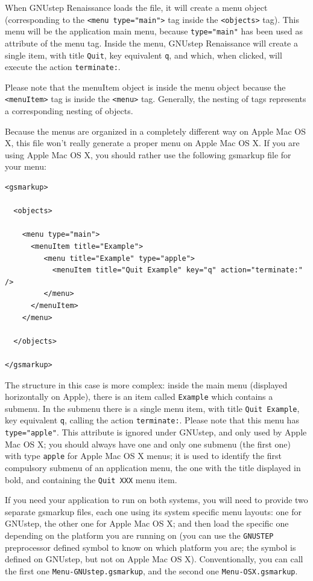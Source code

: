 \documentclass[a4paper]{article}
\begin{document}
When GNUstep Renaissance loads the file, it will create a menu object
(corresponding to the \texttt{<menu type="main">} tag inside the
\texttt{<objects>} tag).  This menu will be the application main menu,
because \texttt{type="main"} has been used as attribute of the menu
tag.  Inside the menu, GNUstep Renaissance will create a single item,
with title \texttt{Quit}, key equivalent \texttt{q}, and which, when
clicked, will execute the action \texttt{terminate:}.

Please note that the menuItem object is inside the menu object because
the \texttt{<menuItem>} tag is inside the \texttt{<menu>} tag.
Generally, the nesting of tags represents a corresponding nesting of
objects.

Because the menus are organized in a completely different way on Apple
Mac OS X, this file won't really generate a proper menu on Apple Mac
OS X.  If you are using Apple Mac OS X, you should rather use the
following gsmarkup file for your menu:
\begin{verbatim}
<gsmarkup>

  <objects>

    <menu type="main">
      <menuItem title="Example">
         <menu title="Example" type="apple">
           <menuItem title="Quit Example" key="q" action="terminate:" />
         </menu>
      </menuItem>
    </menu>
 
  </objects>

</gsmarkup>
\end{verbatim}
The structure in this case is more complex: inside the main menu
(displayed horizontally on Apple), there is an item called
\texttt{Example} which contains a submenu.  In the submenu there is a
single menu item, with title \texttt{Quit Example}, key equivalent
\texttt{q}, calling the action \texttt{terminate:}.  Please note that
this menu has \texttt{type="apple"}.  This attribute is ignored under
GNUstep, and only used by Apple Mac OS X; you should always have one
and only one submenu (the first one) with type \texttt{apple} for
Apple Mac OS X menus; it is used to identify the first compulsory
submenu of an application menu, the one with the title displayed in
bold, and containing the \texttt{Quit XXX} menu item.

If you need your application to run on both systems, you will need to
provide two separate gsmarkup files, each one using its system
specific menu layouts: one for GNUstep, the other one for Apple Mac OS
X; and then load the specific one depending on the platform you are
running on (you can use the \texttt{GNUSTEP} preprocessor defined
symbol to know on which platform you are; the symbol is defined on
GNUstep, but not on Apple Mac OS X).  Conventionally, you can call the
first one \texttt{Menu-GNUstep.gsmarkup}, and the second one
\texttt{Menu-OSX.gsmarkup}.
\end{document}
